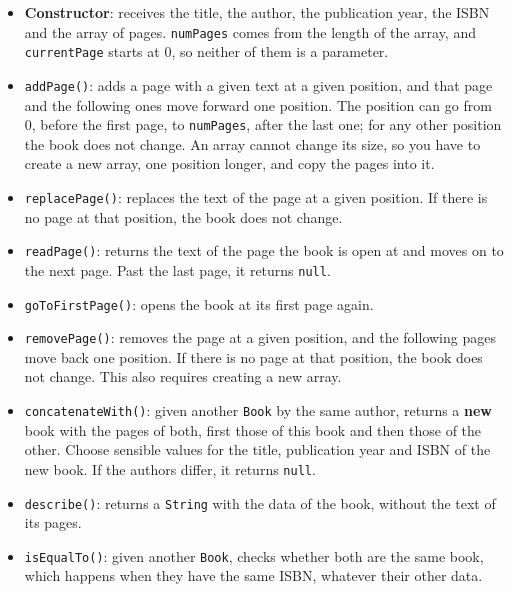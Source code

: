 \begin{itemize}
\begin{itemize}
            \item \textbf{Constructor}: receives the title, the author, the publication year, the ISBN and the array of pages. \texttt{numPages} comes from the length of the array, and \texttt{currentPage} starts at 0, so neither of them is a parameter.

            \item \texttt{addPage()}: adds a page with a given text at a given position, and that page and the following ones move forward one position. The position can go from 0, before the first page, to \texttt{numPages}, after the last one; for any other position the book does not change. An array cannot change its size, so you have to create a new array, one position longer, and copy the pages into it.

            \item \texttt{replacePage()}: replaces the text of the page at a given position. If there is no page at that position, the book does not change.

            \item \texttt{readPage()}: returns the text of the page the book is open at and moves on to the next page. Past the last page, it returns \texttt{null}.

            \item \texttt{goToFirstPage()}: opens the book at its first page again.

            \item \texttt{removePage()}: removes the page at a given position, and the following pages move back one position. If there is no page at that position, the book does not change. This also requires creating a new array.

            \item \texttt{concatenateWith()}: given another \texttt{Book} by the same author, returns a \textbf{new} book with the pages of both, first those of this book and then those of the other. Choose sensible values for the title, publication year and ISBN of the new book. If the authors differ, it returns \texttt{null}.

            \item \texttt{describe()}: returns a \texttt{String} with the data of the book, without the text of its pages.

            \item \texttt{isEqualTo()}: given another \texttt{Book}, checks whether both are the same book, which happens when they have the same ISBN, whatever their other data.

        \end{itemize}

\end{itemize}

